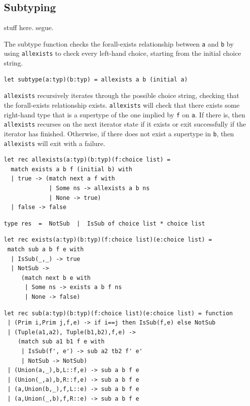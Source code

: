 \documentclass[a4paper,english]{lipics-v2019}
\renewcommand{\c}[1]{\lstinline{#1}\xspace}
\begin{document}
\subsection{Subtyping}

stuff here. segue.

The subtype function checks the forall-exists relationship between
\c{a} and \c{b} by using \c{allexists} to check every left-hand choice,
starting from the initial choice string.

\begin{lstlisting}
let subtype(a:typ)(b:typ) = allexists a b (initial a)
\end{lstlisting}

\c{allexists} recursively iterates through the possible choice string,
checking that the forall-exists relationship exists. \c{allexists} will check
that there exists some right-hand type that is a supertype of the one implied
by \c{f} on \c{a}. If there is, then \c{allexists} recurses on the next
iterator state if it exists or exit successfully if the iterator has finished.
Otherwise, if there does not exist a supertype in \c{b}, then \c{allexists}
will exit with a failure.

\begin{lstlisting}
let rec allexists(a:typ)(b:typ)(f:choice list) =
  match exists a b f (initial b) with 
  | true -> (match next a f with
             | Some ns -> allexists a b ns 
             | None -> true) 
  | false -> false
\end{lstlisting}


\begin{lstlisting}
type res  =  NotSub  |  IsSub of choice list * choice list
\end{lstlisting}

\begin{lstlisting}
let rec exists(a:typ)(b:typ)(f:choice list)(e:choice list) =
 match sub a b f e with 
  | IsSub(_,_) -> true 
  | NotSub -> 
     (match next b e with
      | Some ns -> exists a b f ns 
      | None -> false) 
\end{lstlisting}




\begin{lstlisting}
let rec sub(a:typ)(b:typ)(f:choice list)(e:choice list) = function
 | (Prim i,Prim j,f,e) -> if i==j then IsSub(f,e) else NotSub
 | (Tuple(a1,a2), Tuple(b1,b2),f,e) ->
    (match sub a1 b1 f e with
     | IsSub(f', e') -> sub a2 tb2 f' e'
     | NotSub -> NotSub)
 | (Union(a,_),b,L::f,e) -> sub a b f e
 | (Union(_,a),b,R::f,e) -> sub a b f e
 | (a,Union(b,_),f,L::e) -> sub a b f e
 | (a,Union(_,b),f,R::e) -> sub a b f e
\end{lstlisting}
\end{document}
